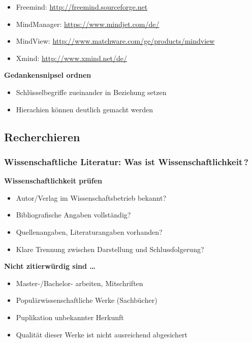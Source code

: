 \begin{itemize}%
\item
  Freemind: \url{http://freemind.sourceforge.net}
\item
  MindManager: \url{https://www.mindjet.com/de/}
\item
  MindView: \url{http://www.matchware.com/ge/products/mindview}
\item
  Xmind: \url{http://www.xmind.net/de/}
\end{itemize}

\textbf{Gedankensnipsel ordnen}

\begin{itemize}%
\item
  Schlüsselbegriffe zueinander in Beziehung setzen
\item
  Hierachien können deutlich gemacht werden
\end{itemize}

\subsection{Recherchieren}\label{recherchieren}

\subsubsection{\texorpdfstring{Wissenschaftliche Literatur: Was ist
\frqq Wissenschaftlichkeit\flqq\,?}{Wissenschaftliche Literatur: Was ist Wissenschaftlichkeit?}}\label{wissenschaftliche-literatur-was-ist-wissenschaftlichkeit}

\textbf{Wissenschaftlichkeit prüfen}

\begin{itemize}%
\item
  Autor/Verlag im Wissenschaftsbetrieb bekannt?
\item
  Bibliografische Angaben vollständig?
\item
  Quellenangaben, Literaturangaben vorhanden?
\item
  Klare Trennung zwischen Darstellung und Schlussfolgerung?
\end{itemize}

\textbf{Nicht zitierwürdig sind \ldots{}}

\begin{itemize}%
\item
  Master-/Bachelor- arbeiten, Mitschriften
\item
  Populärwissenschaftliche Werke (Sachbücher)
\item
  Puplikation unbekannter Herkunft
\item
  Qualität dieser Werke ist nicht ausreichend abgesichert
\end{itemize}

